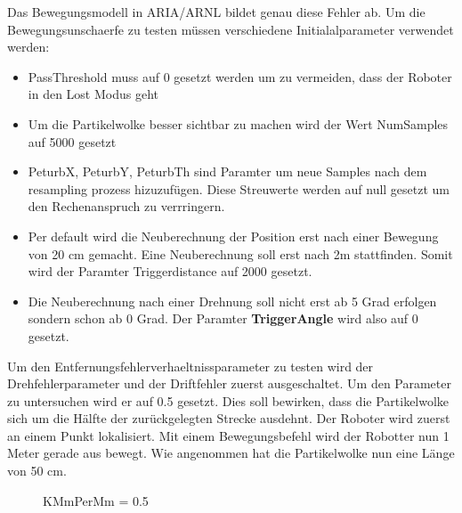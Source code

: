 \documentclass{article}
\begin{document}
Das Bewegungsmodell in ARIA/ARNL bildet genau diese Fehler ab.
Um die Bewegungsunschaerfe zu testen m\"ussen verschiedene Initialalparameter verwendet werden:
\begin{itemize}
\item PassThreshold muss auf 0 gesetzt werden um zu vermeiden, dass der Roboter in den Lost Modus geht
\item Um die Partikelwolke besser sichtbar zu machen wird der Wert NumSamples auf 5000 gesetzt
\item PeturbX, PeturbY, PeturbTh sind Paramter um neue Samples nach dem resampling prozess hizuzuf\"ugen. Diese Streuwerte werden auf null gesetzt um den Rechenanspruch zu verrringern.
\item Per default wird die Neuberechnung der Position erst nach einer Bewegung von 20 cm gemacht. Eine Neuberechnung soll erst nach 2m stattfinden. Somit wird der Paramter Triggerdistance auf 2000 gesetzt. 
\item Die Neuberechnung nach einer Drehnung soll nicht erst ab 5 Grad erfolgen sondern schon ab 0 Grad. Der Paramter \textbf{TriggerAngle} wird also auf 0 gesetzt.
\end{itemize}

Um den Entfernungsfehlerverhaeltnissparameter zu testen wird der Drehfehlerparameter und der Driftfehler zuerst ausgeschaltet. Um den Parameter zu untersuchen wird er auf 0.5 gesetzt. Dies soll bewirken, dass die Partikelwolke sich um die H\"alfte der zur\"uckgelegten Strecke ausdehnt. Der Roboter wird zuerst an einem Punkt lokalisiert. Mit einem Bewegungsbefehl wird der Robotter nun 1 Meter gerade aus bewegt. Wie angenommen hat die Partikelwolke nun eine L\"ange von 50 cm. 

\begin{figure}
  \centering
  \caption{KMmPerMm = 0.5}
  \label{KMmPerMmTest}
\end{figure}
\end{document}

